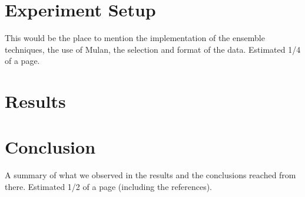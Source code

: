 \section{Experiment Setup}
This would be the place to mention the implementation of the ensemble
techniques, the use of Mulan, the selection and format of the data. Estimated
1/4 of a page.

\section{Results}






\section{Conclusion}
A summary of what we observed in the results and the conclusions reached from
there. Estimated 1/2 of a page (including the references).
